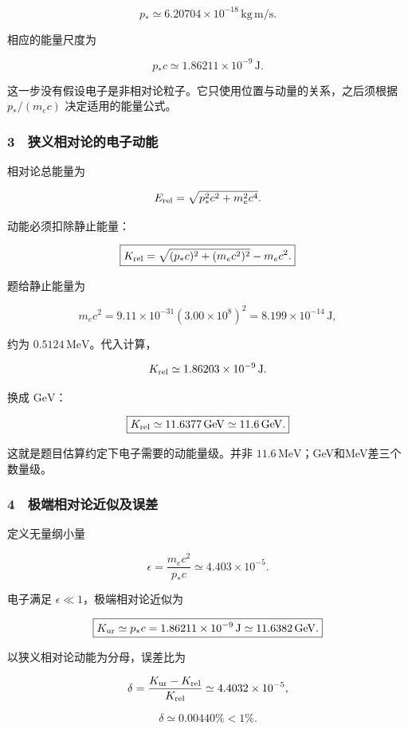 \documentclass[12pt,a4paper,fontset=fandol]{ctexart}
\begin{document}
\[p_*\simeq6.20704\times10^{-18}\,\mathrm{kg\,m/s}.\]

相应的能量尺度为

\[\boxed{p_*c\simeq1.86211\times10^{-9}\,\mathrm J.}\]

这一步没有假设电子是非相对论粒子。它只使用位置与动量的关系，之后须根据
\(p_*/(m_ec)\) 决定适用的能量公式。

\subsubsection{3　狭义相对论的电子动能}\label{ux72edux4e49ux76f8ux5bf9ux8bbaux7684ux7535ux5b50ux52a8ux80fd}

相对论总能量为

\[E_{\rm rel}=\sqrt{p_*^2c^2+m_e^2c^4}.\]

动能必须扣除静止能量：

\[\boxed{K_{\rm rel}
=\sqrt{(p_*c)^2+(m_ec^2)^2}-m_ec^2.}\]

题给静止能量为

\[m_ec^2=9.11\times10^{-31}(3.00\times10^8)^2
=8.199\times10^{-14}\,\mathrm J,\]

约为 \(0.5124\,\mathrm{MeV}\)。代入计算，

\[K_{\rm rel}\simeq1.86203\times10^{-9}\,\mathrm J.\]

换成 \(\mathrm{GeV}\)：

\[\boxed{K_{\rm rel}\simeq11.6377\,\mathrm{GeV}
\simeq11.6\,\mathrm{GeV}.}\]

这就是题目估算约定下电子需要的动能量级。并非
\(11.6\,\mathrm{MeV}\)；GeV和MeV差三个数量级。

\subsubsection{4　极端相对论近似及误差}\label{ux6781ux7aefux76f8ux5bf9ux8bbaux8fd1ux4f3cux53caux8befux5dee}

定义无量纲小量

\[\epsilon=\frac{m_ec^2}{p_*c}
\simeq4.403\times10^{-5}.\]

电子满足 \(\epsilon\ll1\)，极端相对论近似为

\[\boxed{K_{\rm ur}\simeq p_*c
=1.86211\times10^{-9}\,\mathrm J
\simeq11.6382\,\mathrm{GeV}.}\]

以狭义相对论动能为分母，误差比为

\[\delta=\frac{K_{\rm ur}-K_{\rm rel}}{K_{\rm rel}}
\simeq4.4032\times10^{-5},\]

\[\boxed{\delta\simeq0.00440\%<1\%.}\]
\end{document}
